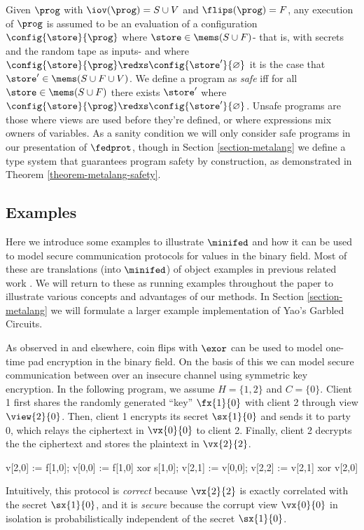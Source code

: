 Given $\prog$ with $\iov(\prog) = S \cup V$ and $\flips(\prog) = F$,
any execution of $\prog$ is assumed to be an evaluation of a
configuration $\config{\store}{\prog}$ where $\store \in \mems(S \cup
F)$- that is, with secrets and the random tape as inputs- and where
$\config{\store}{\prog} \redxs \config{\store'}{\varnothing}$ it is
the case that $\store' \in \mems(S \cup F \cup V)$. We define a
program as \emph{safe} iff for all $\store \in \mems(S \cup F)$ there
exists $\store'$ where $\config{\store}{\prog} \redxs
\config{\store'}{\varnothing}$. Unsafe programs are those where views
are used before they're defined, or where expressions mix owners of
variables. As a sanity condition we will only consider safe 
programs in our presentation of $\fedprot$, though in Section
\ref{section-metalang} we define a type system that guarantees
program safety by construction, as demonstrated in Theorem
\ref{theorem-metalang-safety}.

\subsection{Examples}
\label{section-minicat-examples}

Here we introduce some examples to illustrate $\minifed$ and how it
can be used to model secure communication protocols for values in the
binary field. Most of these are translations (into $\minifed$) of
object examples in previous related work
\cite{barthe2019probabilistic,darais2019language}.  We will return to
these as running examples throughout the paper to illustrate various
concepts and advantages of our methods. In Section
\ref{section-metalang} we will formulate a larger example
implementation of Yao's Garbled Circuits.
\begin{example}
  \label{example-otp}
As observed in \cite{barthe2019probabilistic} and elsewhere, coin flips with $\exor$ can
be used to model one-time pad encryption in the binary field. On the
basis of this we can model secure communication between over an
insecure channel using symmetric key encryption. In the following
program, we assume $H = \{ 1,2 \}$ and $C = \{ 0 \}$. Client 1 first
shares the randomly generated ``key'' $\fx{1}{0}$ with client 2
through view $\view{2}{0}$. Then, client 1 encrypts its secret
$\sx{1}{0}$ and sends it to party 0, which relays the ciphertext in
$\vx{0}{0}$ to client 2. Finally, client 2 decrypts the the ciphertext
and stores the plaintext in $\vx{2}{2}$.
\begin{verbatimtab}
v[2,0] := f[1,0];
v[0,0] := f[1,0] xor s[1,0];
v[2,1] := v[0,0];
v[2,2] := v[2,1] xor v[2,0]
\end{verbatimtab}
Intuitively, this protocol is \emph{correct} because $\vx{2}{2}$ is
exactly correlated with the secret $\sx{1}{0}$, and it is
\emph{secure} because the corrupt view $\vx{0}{0}$ in isolation is
probabilistically independent of the secret $\sx{1}{0}$.
\end{example}

